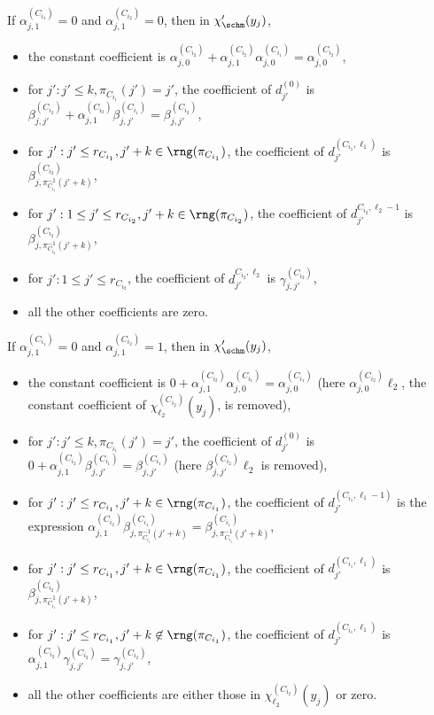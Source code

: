 
If $\alpha^{(C_{i_1})}_{j,1} = 0$ and $\alpha^{(C_{i_2})}_{j,1} = 0$, then in $\chi'_\schm(y_j)$,
\begin{itemize}
\item the constant coefficient is $\alpha^{(C_{i_2})}_{j,0} + \alpha^{(C_{i_2})}_{j,1}  \alpha^{(C_{i_1})}_{j,0} = \alpha^{(C_{i_2})}_{j,0}$,
%
%
\item for $j': j' \le k, \pi_{C_{i_1}}(j') = j'$, the coefficient of $d^{(0)}_{j'}$ is $\beta^{(C_{i_2})}_{j,j'} + \alpha^{(C_{i_2})}_{j,1} \beta^{(C_{i_1})}_{j,j'} = \beta^{(C_{i_2})}_{j,j'}$,
%
\item for $j': j' \le r_{C_{i_1}}, j'+k \in \rng(\pi_{C_{i_1}})$, the coefficient of $d^{(C_{i_1},\ell_1)}_{j'}$ is $\beta^{(C_{i_2})}_{j, \pi^{-1}_{C_{i_1}}(j'+k)} $,
%
\item for $j': 1 \le j' \le r_{C_{i_2}}, j'+k \in \rng(\pi_{C_{i_2}})$, the coefficient of $d^{C_{i_2},\ell_2-1}_{j'}$ is $\beta^{(C_{i_2})}_{j, \pi^{-1}_{C_{i_2}}(j'+k)}$,
%
\item for $j': 1 \le j' \le r_{C_{i_2}}$, the coefficient of $d^{C_{i_2},\ell_2}_{j'}$ is $\gamma^{(C_{i_2})}_{j, j'}$,
%
\item all the other coefficients are zero.
\end{itemize}

If $\alpha^{(C_{i_1})}_{j,1} = 0$ and $\alpha^{(C_{i_2})}_{j,1} = 1$, then in $\chi'_\schm(y_j)$,
\begin{itemize}
\item the constant coefficient is $0 + \alpha^{(C_{i_2})}_{j,1}  \alpha^{(C_{i_1})}_{j,0} = \alpha^{(C_{i_1})}_{j,0}$ (here $\alpha^{(C_{i_2})}_{j,0} \ell_2$, the constant coefficient of $\chi^{(C_{i_2})}_{\ell_2}(y_j)$, is removed),
%
\item for $j': j' \le k, \pi_{C_{i_1}}(j') = j'$, the coefficient of $d^{(0)}_{j'}$ is $0 + \alpha^{(C_{i_2})}_{j,1} \beta^{(C_{i_1})}_{j,j'} = \beta^{(C_{i_1})}_{j,j'}$ (here $\beta^{(C_{i_2})}_{j,j'} \ell_2$ is removed),
%
\item for $j': j' \le r_{C_{i_1}}, j'+k \in \rng(\pi_{C_{i_1}})$, the coefficient of $d^{(C_{i_1},\ell_1-1)}_{j'}$ is the expression $\alpha^{(C_{i_2})}_{j,1} \beta^{(C_{i_1})}_{j, \pi^{-1}_{C_{i_1}}(j'+k)} = \beta^{(C_{i_1})}_{j, \pi^{-1}_{C_{i_1}}(j'+k)}$,
%
\item for $j': j' \le r_{C_{i_1}}, j'+k \in \rng(\pi_{C_{i_1}})$, the coefficient of $d^{(C_{i_1},\ell_1)}_{j'}$ is $\beta^{(C_{i_2})}_{j, \pi^{-1}_{C_{i_1}}(j'+k)}$,
%
\item for $j': j' \le r_{C_{i_1}}, j'+k \not \in \rng(\pi_{C_{i_1}})$, the coefficient of $d^{(C_{i_1},\ell_1)}_{j'}$ is $\alpha^{(C_{i_2})}_{j,1}  \gamma^{(C_{i_2})}_{j,j'} = \gamma^{(C_{i_2})}_{j,j'}$,
%
\item all the other coefficients are either those in $\chi^{(C_{i_2})}_{\ell_2}(y_j)$ or zero.
\end{itemize}

